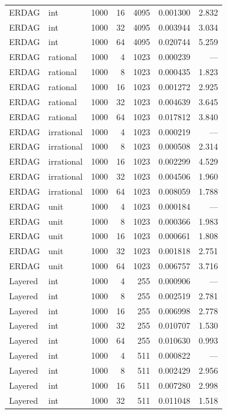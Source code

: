 \begin{longtable}{l l r r r r r}
ERDAG & int & 1000 & 16 & 4095 & 0.001300 & 2.832 \\
ERDAG & int & 1000 & 32 & 4095 & 0.003944 & 3.034 \\
ERDAG & int & 1000 & 64 & 4095 & 0.020744 & 5.259 \\
\addlinespace
ERDAG & rational & 1000 & 4 & 1023 & 0.000239 & --- \\
ERDAG & rational & 1000 & 8 & 1023 & 0.000435 & 1.823 \\
ERDAG & rational & 1000 & 16 & 1023 & 0.001272 & 2.925 \\
ERDAG & rational & 1000 & 32 & 1023 & 0.004639 & 3.645 \\
ERDAG & rational & 1000 & 64 & 1023 & 0.017812 & 3.840 \\
\addlinespace
ERDAG & irrational & 1000 & 4 & 1023 & 0.000219 & --- \\
ERDAG & irrational & 1000 & 8 & 1023 & 0.000508 & 2.314 \\
ERDAG & irrational & 1000 & 16 & 1023 & 0.002299 & 4.529 \\
ERDAG & irrational & 1000 & 32 & 1023 & 0.004506 & 1.960 \\
ERDAG & irrational & 1000 & 64 & 1023 & 0.008059 & 1.788 \\
\addlinespace
ERDAG & unit & 1000 & 4 & 1023 & 0.000184 & --- \\
ERDAG & unit & 1000 & 8 & 1023 & 0.000366 & 1.983 \\
ERDAG & unit & 1000 & 16 & 1023 & 0.000661 & 1.808 \\
ERDAG & unit & 1000 & 32 & 1023 & 0.001818 & 2.751 \\
ERDAG & unit & 1000 & 64 & 1023 & 0.006757 & 3.716 \\
\addlinespace
Layered & int & 1000 & 4 & 255 & 0.000906 & --- \\
Layered & int & 1000 & 8 & 255 & 0.002519 & 2.781 \\
Layered & int & 1000 & 16 & 255 & 0.006998 & 2.778 \\
Layered & int & 1000 & 32 & 255 & 0.010707 & 1.530 \\
Layered & int & 1000 & 64 & 255 & 0.010630 & 0.993 \\
\addlinespace
Layered & int & 1000 & 4 & 511 & 0.000822 & --- \\
Layered & int & 1000 & 8 & 511 & 0.002429 & 2.956 \\
Layered & int & 1000 & 16 & 511 & 0.007280 & 2.998 \\
Layered & int & 1000 & 32 & 511 & 0.011048 & 1.518 \\

\end{longtable}
